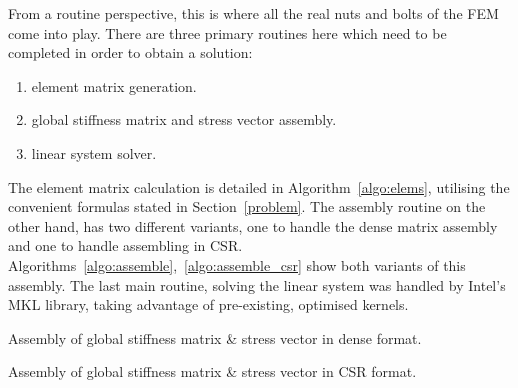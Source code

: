 From a routine perspective, this is where all the real nuts and bolts of the FEM come into play.  There are three primary routines here which need to be completed in order to obtain a solution:
\begin{enumerate}
	\item element matrix generation.
	\item global stiffness matrix and stress vector assembly.
	\item linear system solver.
\end{enumerate}
The element matrix calculation is detailed in Algorithm~\ref{algo:elems}, utilising the convenient formulas stated in Section~\ref{problem}. The assembly routine on the other hand, has two different variants, one to handle the dense matrix assembly and one to handle assembling in CSR. Algorithms~\ref{algo:assemble},~\ref{algo:assemble_csr} show both variants of this assembly. The last main routine, solving the linear system was handled by Intel's MKL library, taking advantage of pre-existing, optimised kernels.

\begin{algorithm}
	\caption{Assembly of global stiffness matrix \& stress vector in dense format.}
	\label{algo:assemble}
\end{algorithm}
\begin{algorithm}
	\caption{Assembly of global stiffness matrix \& stress vector in CSR format.}
	\label{algo:assemble_csr}
\end{algorithm}

